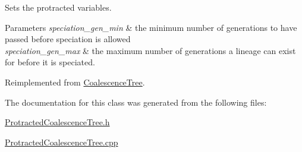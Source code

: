 Sets the protracted variables. 


\begin{DoxyParams}{Parameters}
{\em speciation\+\_\+gen\+\_\+min} & the minimum number of generations to have passed before speciation is allowed \\
\hline
{\em speciation\+\_\+gen\+\_\+max} & the maximum number of generations a lineage can exist for before it is speciated. \\
\hline
\end{DoxyParams}


Reimplemented from \hyperlink{class_tree_a891764ffc1e29d3edbe0fd08e67a184b}{CoalescenceTree}.



The documentation for this class was generated from the following files\+:\begin{DoxyCompactItemize}
\item 
\hyperlink{_protracted_tree_8h}{Protracted\+CoalescenceTree.\+h}\item
\hyperlink{_protracted_tree_8cpp}{Protracted\+CoalescenceTree.\+cpp}\end{DoxyCompactItemize}
